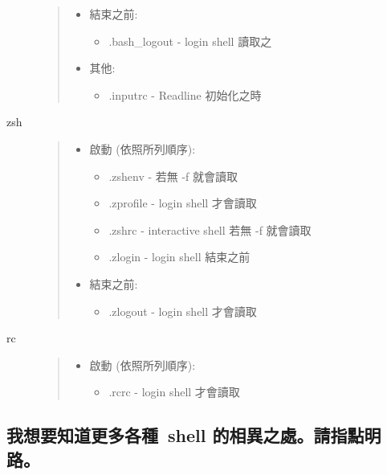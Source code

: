 \documentclass{article}
\begin{document}
\begin{CJK*}{Bg5}{ming}
\begin{description}
\begin{quote}
\begin{itemize}
         \item 結束之前:
	 \begin{itemize}
            \item  .bash\_logout  - login shell 讀取之
	 \end{itemize}
         \item 其他:
	 \begin{itemize}
            \item  .inputrc      - Readline 初始化之時
	 \end{itemize}
	\end{itemize}
\end{quote}
      \item[zsh]
\begin{quote}
	\begin{itemize}
          \item 啟動 (依照所列順序):
	\begin{itemize}
             \item  .zshenv - 若無 -f  就會讀取
             \item .zprofile - login shell 才會讀取
             \item  .zshrc    - interactive shell 若無 -f  就會讀取
             \item .zlogin   - login shell 結束之前
	\end{itemize}

          \item 結束之前:
	\begin{itemize}
             \item .zlogout  - login shell 才會讀取
	\end{itemize}
	\end{itemize}
\end{quote}
      \item[rc]
\begin{quote}
	\begin{itemize}
          \item 啟動 (依照所列順序):
	   \begin{itemize}
             \item .rcrc - login shell 才會讀取
	   \end{itemize}
	\end{itemize}
\end{quote}
\end{description}

\subsection{我想要知道更多各種~shell 的相異之處。請指點明路。}


\end{CJK*}
\end{document}
